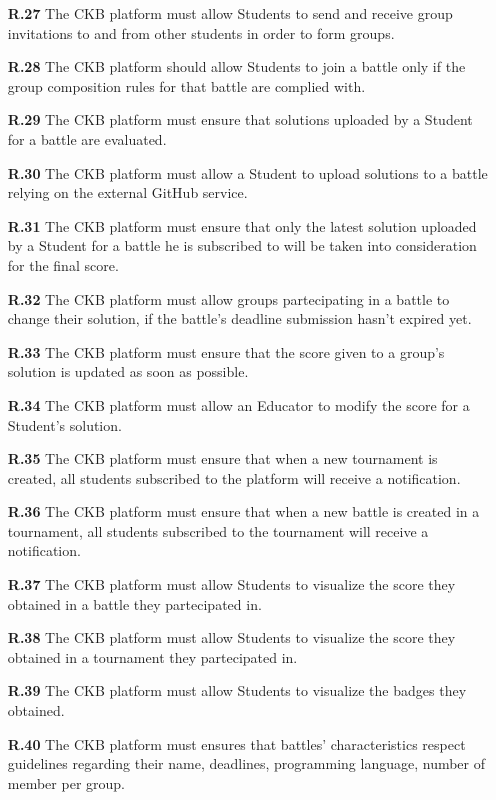 \documentclass{article}
\begin{document}
{\begin{itemize}
    \item[\textbf{R.27}] The CKB platform must allow Students to send and receive group invitations to and from
          other students in order to form groups.
    \item[\textbf{R.28}] The CKB platform should allow Students to join a battle only if the group composition rules
          for that battle are complied with.
    \item[\textbf{R.29}] The CKB platform must ensure that solutions uploaded by a Student for a battle are evaluated.
    \item[\textbf{R.30}] The CKB platform must allow a Student to upload solutions to a battle relying on the
          external GitHub service.
    \item[\textbf{R.31}] The CKB platform must ensure that only the latest solution uploaded by a Student for a battle he is subscribed to will
          be taken into consideration for the final score.
    \item[\textbf{R.32}] The CKB platform must allow groups partecipating in a battle to change their solution,
          if the battle's deadline submission hasn't expired yet.
    \item[\textbf{R.33}] The CKB platform must ensure that the score given to a group's solution is
          updated as soon as possible.
    \item[\textbf{R.34}] The CKB platform must allow an Educator to modify the score for a Student's solution.
    \item[\textbf{R.35}] The CKB platform must ensure that when a new tournament is created, all
          students subscribed to the platform will receive a notification.
    \item[\textbf{R.36}] The CKB platform must ensure that when a new battle is created in a tournament,
          all students subscribed to the tournament will receive a notification.
    \item[\textbf{R.37}] The CKB platform must allow Students to visualize the score they obtained in a battle they partecipated in.
    \item[\textbf{R.38}] The CKB platform must allow Students to visualize the score they obtained in a tournament they partecipated in.
    \item[\textbf{R.39}] The CKB platform must allow Students to visualize the badges they obtained.
    \item[\textbf{R.40}] The CKB platform must ensures that battles' characteristics respect guidelines
          regarding their name, deadlines, programming language, number of member per group.
\end{itemize}

}
\end{document}
